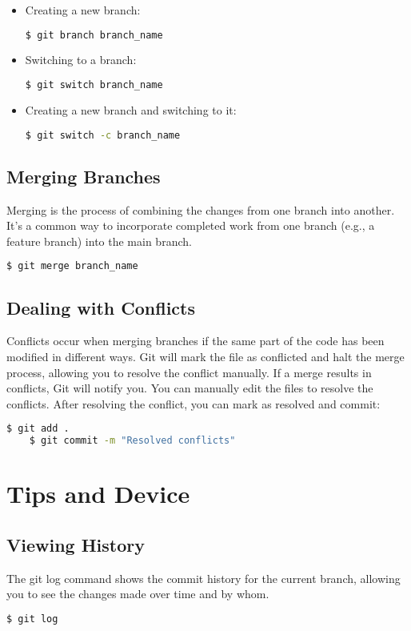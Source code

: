 \documentclass[10pt,twocolumn]{article}
\begin{document}
\begin{itemize}
    \item Creating a new branch:
    \begin{lstlisting}[language=bash]
    $ git branch branch_name
    \end{lstlisting}
    \item Switching to a branch:
    \begin{lstlisting}[language=bash]
    $ git switch branch_name
    \end{lstlisting}
    \item Creating a new branch and switching to it:
    \begin{lstlisting}[language=bash]
    $ git switch -c branch_name
    \end{lstlisting}
\end{itemize}

\subsection{Merging Branches}
Merging is the process of combining the changes from one branch into another. It's a common way to incorporate completed work from one branch (e.g., a feature branch) into the main branch.
\begin{lstlisting}[language=bash]
    $ git merge branch_name
    \end{lstlisting}
\subsection{Dealing with Conflicts}
Conflicts occur when merging branches if the same part of the code has been modified in different ways. Git will mark the file as conflicted and halt the merge process, allowing you to resolve the conflict manually. If a merge results in conflicts, Git will notify you. You can manually edit the files to resolve the conflicts. After resolving the conflict, you can mark as resolved and commit:
\begin{lstlisting}[language=bash]
    $ git add .
    $ git commit -m "Resolved conflicts"
    \end{lstlisting}




\section{Tips and Device}
\subsection{Viewing History}
The git log command shows the commit history for the current branch, allowing you to see the changes made over time and by whom.
\begin{lstlisting}[language=bash]
    $ git log
    \end{lstlisting}
\end{document}
